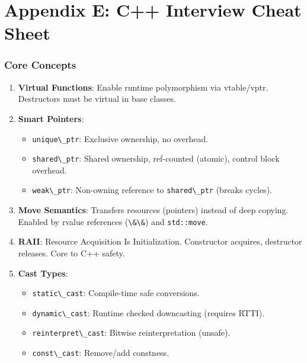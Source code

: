 \hypertarget{appendix-e-c-interview-cheat-sheet}{%
\chapter{Appendix E: C++ Interview Cheat
Sheet}\label{appendix-e-c-interview-cheat-sheet}}

\hypertarget{core-concepts}{%
\subsection{Core Concepts}\label{core-concepts}}

\begin{enumerate}
\def\labelenumi{\arabic{enumi}.}
\tightlist
\item
  \textbf{Virtual Functions}: Enable runtime polymorphism via
  vtable/vptr. Destructors must be virtual in base classes.
\item
  \textbf{Smart Pointers}:

  \begin{itemize}
  \tightlist
  \item
    \passthrough{\lstinline!unique\_ptr!}: Exclusive ownership, no
    overhead.
  \item
    \passthrough{\lstinline!shared\_ptr!}: Shared ownership, ref-counted
    (atomic), control block overhead.
  \item
    \passthrough{\lstinline!weak\_ptr!}: Non-owning reference to
    \passthrough{\lstinline!shared\_ptr!} (breaks cycles).
  \end{itemize}
\item
  \textbf{Move Semantics}: Transfers resources (pointers) instead of
  deep copying. Enabled by rvalue references
  (\passthrough{\lstinline!\&\&!}) and
  \passthrough{\lstinline!std::move!}.
\item
  \textbf{RAII}: Resource Acquisition Is Initialization. Constructor
  acquires, destructor releases. Core to C++ safety.
\item
  \textbf{Cast Types}:

  \begin{itemize}
  \tightlist
  \item
    \passthrough{\lstinline!static\_cast!}: Compile-time safe
    conversions.
  \item
    \passthrough{\lstinline!dynamic\_cast!}: Runtime checked downcasting
    (requires RTTI).
  \item
    \passthrough{\lstinline!reinterpret\_cast!}: Bitwise
    reinterpretation (unsafe).
  \item
    \passthrough{\lstinline!const\_cast!}: Remove/add constness.
  \end{itemize}
\end{enumerate}

